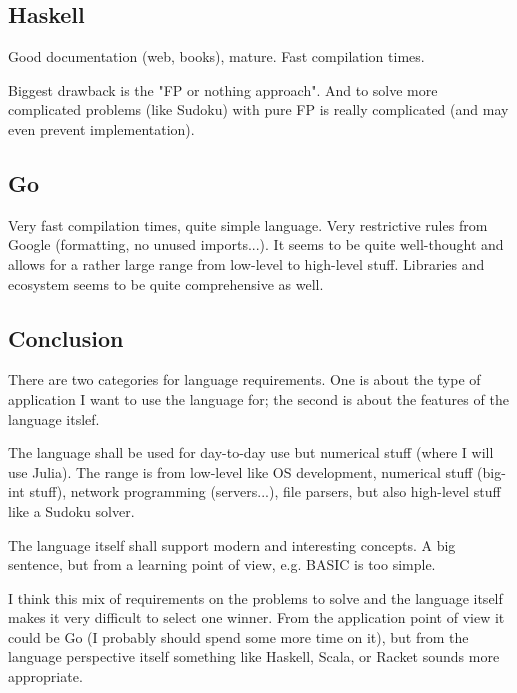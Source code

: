 \subsection{Haskell}

Good documentation (web, books), mature. Fast compilation times.

Biggest drawback is the "FP or nothing approach". And to solve more complicated problems (like Sudoku) with pure FP is really complicated (and may even prevent implementation).

\subsection{Go}

Very fast compilation times, quite simple language. Very restrictive rules from Google (formatting, no unused imports...). It seems to be quite well-thought and allows for a rather large range from low-level to high-level stuff. Libraries and ecosystem seems to be quite comprehensive as well.

\subsection{Conclusion}

There are two categories for language requirements. One is about the type of application I want to use the language for; the second is about the features of the language itslef.

The language shall be used for day-to-day use but numerical stuff (where I will use Julia). The range is from low-level like OS development, numerical stuff (big-int stuff), network programming (servers...), file parsers, but also high-level stuff like a Sudoku solver.

The language itself shall support modern and interesting concepts. A big sentence, but from a learning point of view, e.g. BASIC is too simple.

I think this mix of requirements on the problems to solve and the language itself makes it very difficult to select one winner. From the application point of view it could be Go (I probably should spend some more time on it), but from the language perspective itself something like Haskell, Scala, or Racket sounds more appropriate.
